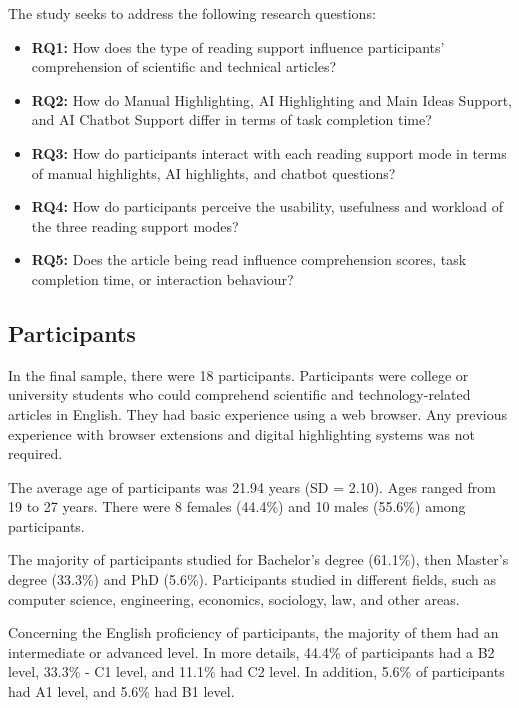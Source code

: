\documentclass{IEEEtran}
\begin{document}
The study seeks to address the following research questions:

\begin{itemize}
    \item \textbf{RQ1:} How does the type of reading support influence participants' comprehension of scientific and technical articles?
    \item \textbf{RQ2:} How do Manual Highlighting, AI Highlighting and Main Ideas Support, and AI Chatbot Support differ in terms of task completion time?
    \item \textbf{RQ3:} How do participants interact with each reading support mode in terms of manual highlights, AI highlights, and chatbot questions?
    \item \textbf{RQ4:} How do participants perceive the usability, usefulness and workload of the three reading support modes?
    \item \textbf{RQ5:} Does the article being read influence comprehension scores, task completion time, or interaction behaviour?

\end{itemize}


\subsection{Participants}

In the final sample, there were 18 participants. Participants were college or university students who could comprehend scientific and technology-related articles in English. They had basic experience using a web browser. Any previous experience with browser extensions and digital highlighting systems was not required.

The average age of participants was 21.94 years (SD = 2.10). Ages ranged from 19 to 27 years. There were 8 females (44.4\%) and 10 males (55.6\%) among participants.

The majority of participants studied for Bachelor's degree (61.1\%), then Master's degree (33.3\%) and PhD (5.6\%). Participants studied in different fields, such as computer science, engineering, economics, sociology, law, and other areas.

Concerning the English proficiency of participants, the majority of them had an intermediate or advanced level. In more details, 44.4\% of participants had a B2 level, 33.3\% - C1 level, and 11.1\% had C2 level. In addition, 5.6\% of participants had A1 level, and 5.6\% had B1 level.
\end{document}
